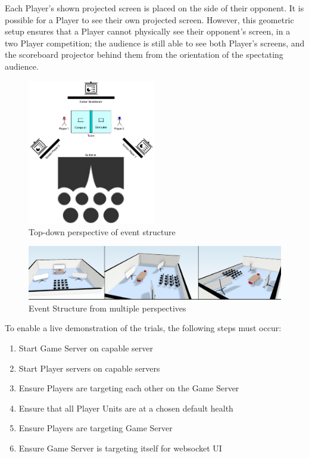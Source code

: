 \documentclass[10pt, titlepage, twocolumn]{article}
\begin{document}
Each Player's shown projected screen is placed on the side of their opponent. It is possible for a Player to see their own projected screen. However, this geometric setup ensures that a Player cannot physically see their opponent's screen, in a two Player competition; the audience is still able to see both Player's screens, and the scoreboard projector behind them from the orientation of the spectating audience.

\begin{figure}[ht]
	\centering
	\includegraphics[width=0.5\textwidth]{EventStructure}
	\caption{Top-down perspective of event structure }
	\label{eventstructure}
\end{figure}

\begin{figure}[ht]
	\centering
	\includegraphics[width=\textwidth]{3dsetupall}
	\caption{Event Structure from multiple perspectives}
	\label{eventstructure}
\end{figure}


 To enable a live demonstration of the trials, the following steps must occur:
\begin{enumerate}
		\item Start Game Server on capable server
		\item Start Player servers on capable servers
		\item Ensure Players are targeting each other on the Game Server 
		\item Ensure that all Player Units are at a chosen default health
		\item Ensure Players are targeting Game Server
		\item Ensure Game Server is targeting itself for websocket UI
\end{enumerate}
\end{document}
